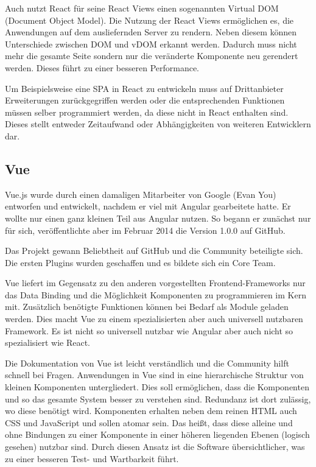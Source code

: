 Auch nutzt React für seine React Views einen sogenannten Virtual DOM (Document Object Model). Die Nutzung der React Views ermöglichen es, die Anwendungen auf dem ausliefernden Server zu rendern. Neben diesem können Unterschiede zwischen DOM und vDOM erkannt werden. Dadurch muss nicht mehr die gesamte Seite sondern nur die veränderte Komponente neu gerendert werden. Dieses führt zu einer besseren Performance. \cite{bezJavaScriptEinfuehrungReact2015}

Um Beispielsweise eine SPA in React zu entwickeln muss auf Drittanbieter Erweiterungen zurückgegriffen werden oder die entsprechenden Funktionen müssen selber programmiert werden, da diese nicht in React enthalten sind. Dieses stellt entweder Zeitaufwand oder Abhängigkeiten von weiteren Entwicklern dar.

\subsection{Vue}
Vue.js wurde durch einen damaligen Mitarbeiter von Google (Evan You) entworfen und entwickelt, nachdem er viel mit Angular gearbeitete hatte. Er wollte nur einen ganz kleinen Teil aus Angular nutzen. So begann er zunächst nur für sich, veröffentlichte aber im Februar 2014 die Version 1.0.0 auf GitHub.

Das Projekt gewann Beliebtheit auf GitHub und die Community beteiligte sich. Die ersten Plugins wurden geschaffen und es bildete sich ein Core Team.

Vue liefert im Gegensatz zu den anderen vorgestellten Frontend-Frameworks nur das Data Binding und die Möglichkeit Komponenten zu programmieren im Kern mit. Zusätzlich benötigte Funktionen können bei Bedarf als Module geladen werden. Dies macht Vue zu einem spezialisierten aber auch universell nutzbaren Framework. Es ist nicht so universell nutzbar wie Angular aber auch nicht so spezialisiert wie React. \cite{teufelVueJsTutorial2018}

Die Dokumentation von Vue ist leicht verständlich und die Community hilft schnell bei Fragen. 
Anwendungen in Vue sind in eine hierarchische Struktur von kleinen Komponenten untergliedert. Dies soll ermöglichen, dass die Komponenten und so das gesamte System besser zu verstehen sind. Redundanz ist dort zulässig, wo diese benötigt wird.
Komponenten erhalten neben dem reinen HTML auch CSS und JavaScript und sollen atomar sein. Das heißt, dass diese alleine und ohne Bindungen zu einer Komponente in einer höheren liegenden Ebenen (logisch gesehen) nutzbar sind. Durch diesen Ansatz ist die Software übersichtlicher, was zu einer besseren Test- und Wartbarkeit führt.

